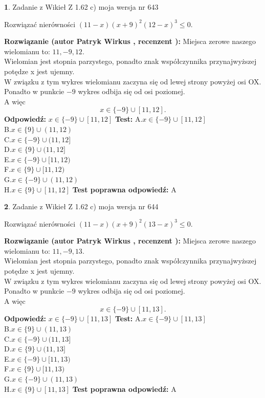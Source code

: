 \documentclass[12pt, a4paper]{article}
\theoremstyle{definition} %
\newtheorem{zad}{}
\newcommand{\zadStart}[1]{\begin{zad}#1\newline}
\newcommand{\zadStop}{\end{zad}}
\newcommand{\rozwStart}[2]{\noindent \textbf{Rozwiązanie (autor #1 , recenzent #2): }\newline}
\newcommand{\rozwStop}{\newline}
\newcommand{\odpStart}{\noindent \textbf{Odpowiedź:}\newline}
\newcommand{\odpStop}{\newline}
\newcommand{\testStart}{\noindent \textbf{Test:}\newline}
\newcommand{\testStop}{\newline}
\newcommand{\kluczStart}{\noindent \textbf{Test poprawna odpowiedź:}\newline}
\newcommand{\kluczStop}{\newline}
\begin{document}
\zadStart{Zadanie z Wikieł Z 1.62 c) moja wersja nr 643}

Rozwiązać nierówności $(11-x)(x+9)^{2}(12-x)^{3}\le0$.
\zadStop
\rozwStart{Patryk Wirkus}{}
Miejsca zerowe naszego wielomianu to: $11, -9, 12$.\\
Wielomian jest stopnia parzystego, ponadto znak współczynnika przy\linebreak najwyższej potędze x jest ujemny.\\ W związku z tym wykres wielomianu zaczyna się od lewej strony powyżej osi OX.\\
Ponadto w punkcie $-9$ wykres odbija się od osi poziomej.\\
A więc $$x \in \{-9\} \cup [11,12].$$
\rozwStop
\odpStart
$x \in \{-9\} \cup [11,12]$
\odpStop
\testStart
A.$x \in \{-9\} \cup [11,12]$\\
B.$x \in \{9\} \cup (11,12)$\\
C.$x \in \{-9\} \cup (11,12]$\\
D.$x \in \{9\} \cup (11,12]$\\
E.$x \in \{-9\} \cup [11,12)$\\
F.$x \in \{9\} \cup [11,12)$\\
G.$x \in \{-9\} \cup (11,12)$\\
H.$x \in \{9\} \cup [11,12]$
\testStop
\kluczStart
A
\kluczStop



\zadStart{Zadanie z Wikieł Z 1.62 c) moja wersja nr 644}

Rozwiązać nierówności $(11-x)(x+9)^{2}(13-x)^{3}\le0$.
\zadStop
\rozwStart{Patryk Wirkus}{}
Miejsca zerowe naszego wielomianu to: $11, -9, 13$.\\
Wielomian jest stopnia parzystego, ponadto znak współczynnika przy\linebreak najwyższej potędze x jest ujemny.\\ W związku z tym wykres wielomianu zaczyna się od lewej strony powyżej osi OX.\\
Ponadto w punkcie $-9$ wykres odbija się od osi poziomej.\\
A więc $$x \in \{-9\} \cup [11,13].$$
\rozwStop
\odpStart
$x \in \{-9\} \cup [11,13]$
\odpStop
\testStart
A.$x \in \{-9\} \cup [11,13]$\\
B.$x \in \{9\} \cup (11,13)$\\
C.$x \in \{-9\} \cup (11,13]$\\
D.$x \in \{9\} \cup (11,13]$\\
E.$x \in \{-9\} \cup [11,13)$\\
F.$x \in \{9\} \cup [11,13)$\\
G.$x \in \{-9\} \cup (11,13)$\\
H.$x \in \{9\} \cup [11,13]$
\testStop
\kluczStart
A
\kluczStop
\end{document}
